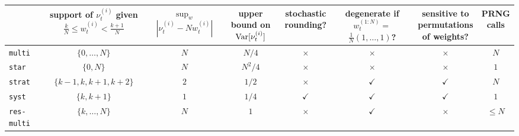


\begin{landscape}
\begin{table}[ht]
\centering
\begin{tabular}{ l | c c c c c c c }
\hline\hline
& \thead{support of $\nu_t^{(i)}$ given
            \\ $ \frac{k}{N} \leq w_t^{(i)} < \frac{k+1}{N}$} 
        & \thead{$\sup_w$\\ $|\nu_t^{(i)} - Nw_t^{(i)}|$}
        & \thead{upper\\ bound on \\ $\operatorname{Var}[\nu_t^{(i)}]$}
        & \thead{stochastic\\ rounding?}       
        & \thead{degenerate if\\ $w_t^{(1:N)} =$\\ $\frac{1}{N}(1,\dots,1)$?} 
        & \thead{sensitive to\\ permutations\\ of weights?} 
        & \thead{PRNG\\ calls} \\
\hline
\texttt{multi} & $\{0,\dots,N\}$ & $N$ & $N/4$ & $\times$ & $\times$ 
        & $\times$ & $N$ \\
\texttt{star} & $\{0, N\}$ & $N$ & $N^2/4$ & $\times$ & $\times$ 
        & $\times$ & $1$ \\
\texttt{strat} & $\{k-1, k, k+1, k+2\}$ & $2$ & $1/2$ & $\times$ & $\checkmark$ 
        & $\checkmark$ & $N$ \\
\texttt{syst} & $\{k, k+1\}$ & $1$ & $1/4$ & $\checkmark$ & $\checkmark$ 
        & $\checkmark$ & $1$ \\
\texttt{res-multi} & $\{k,\dots,N\}$ & $N$ & $1$ & $\times$ & $\checkmark$ 
        & $\times$ & $\leq N$ \\

\end{tabular}
\end{table}
\end{landscape}
